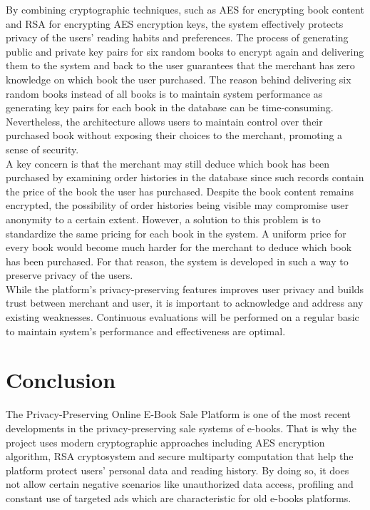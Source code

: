 \documentclass[12pt]{article}
\begin{document}
By combining cryptographic techniques, such as AES for encrypting book content and RSA for encrypting AES encryption keys, the system effectively protects privacy of the users’ reading habits and preferences. The process of generating public and private key pairs for six random books to encrypt again and delivering them to the system and back to the user guarantees that the merchant has zero knowledge on which book the user purchased. The reason behind delivering six random books instead of all books is to maintain system performance as generating key pairs for each book in the database can be time-consuming. Nevertheless, the architecture allows users to maintain control over their purchased book without exposing their choices to the merchant, promoting a sense of security.\\

A key concern is that  the merchant may still deduce which book has been purchased by examining order histories in the database since such records contain the price of the book the user has purchased. Despite the book content remains encrypted, the possibility of order histories being visible may compromise user anonymity to a certain extent. However, a solution to this problem is to standardize the same pricing for each book in the system. A uniform  price for every book would become much harder for the merchant to deduce which book has been purchased. For that reason, the system is developed in such a way to preserve privacy of the users.\\

While the platform’s privacy-preserving features improves user privacy and builds trust between merchant and user, it is important  to acknowledge and address any existing weaknesses. Continuous evaluations will be performed on a regular basic to maintain system’s performance and effectiveness are optimal.
\pagebreak

\section{Conclusion}
The Privacy-Preserving Online E-Book Sale Platform is one of the most recent developments in the privacy-preserving sale systems of e-books. That is why the project uses modern cryptographic approaches including AES encryption algorithm, RSA cryptosystem and secure multiparty computation that help the platform protect users’ personal data and reading history. By doing so, it does not allow certain negative scenarios like unauthorized data access, profiling and constant use of targeted ads which are characteristic for old e-books platforms. \\
\end{document}
